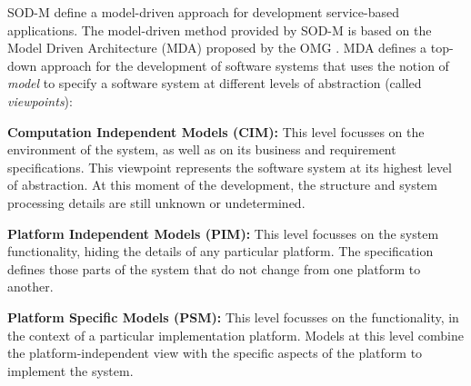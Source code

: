 




SOD-M define a model-driven approach for development service-based applications. The model-driven method provided by SOD-M is based on the Model Driven Architecture (MDA) proposed by the OMG \cite{miller}. MDA defines a top-down approach for the development of software systems that uses the notion of \textit{model} to specify a software system at different levels of abstraction (called \textit{viewpoints}):

\begin{trivlist}
\item \textbf{Computation Independent Models (CIM):} This level focusses on the
environment of the system, as well as on its business and requirement specifications.
This viewpoint represents the software system at its highest level of abstraction.
At this moment of the development, the structure and system processing details are still unknown or undetermined.

\item \textbf{Platform Independent Models (PIM):} This level focusses on the system functionality, hiding the details of any particular platform.
The specification defines those parts of the system that do not change from one platform to another.

\item \textbf{Platform Specific Models (PSM):} This level focusses on the functionality, in the context of a particular implementation platform.
Models at this level combine the platform-independent view with the specific aspects of the platform to implement the system.
\end{trivlist}

